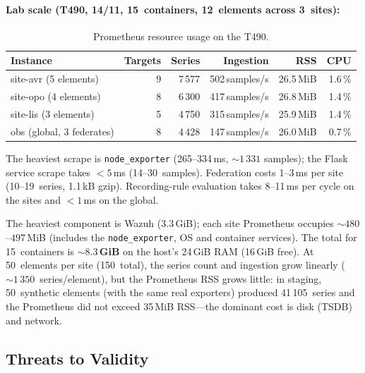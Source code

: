 \documentclass[11pt,a4paper]{article}
\begin{document}
\paragraph{Lab scale (T490, 14/11, 15~containers, 12~elements across 3~sites):}

\begin{table}[H]
  \centering
  \caption{Prometheus resource usage on the T490.}
  \begin{tabular}{@{}lrrrrr@{}}
    \toprule
    \textbf{Instance} & \textbf{Targets} & \textbf{Series} & \textbf{Ingestion} &
      \textbf{RSS} & \textbf{CPU} \\
    \midrule
    site-avr (5 elements) & 9 & 7\,577 & 502\,samples/s & 26.5\,MiB & 1.6\,\% \\
    site-opo (4 elements) & 8 & 6\,300 & 417\,samples/s & 26.8\,MiB & 1.4\,\% \\
    site-lis (3 elements)  & 5 & 4\,750 & 315\,samples/s & 25.9\,MiB & 1.4\,\% \\
    obs (global, 3 federates) & 8 & 4\,428 & 147\,samples/s & 26.0\,MiB & 0.7\,\% \\
    \bottomrule
  \end{tabular}
\end{table}

The heaviest scrape is \texttt{node\_exporter} (265--334\,ms, ${\sim}1\,331$ samples); the
Flask service scrape takes $< 5$\,ms (14--30~samples). Federation costs 1--3\,ms per site
(10--19~series, 1.1\,kB gzip). Recording-rule evaluation takes 8--11\,ms per cycle on the
sites and $< 1$\,ms on the global.

The heaviest component is Wazuh (3.3\,GiB); each site Prometheus occupies
${\sim}480$--$497$\,MiB (includes the \texttt{node\_exporter}, OS and container services).
The total for 15~containers is \textbf{${\sim}8.3$\,GiB} on the host's 24\,GiB RAM
(16\,GiB free). At 50~elements per site (150~total), the series count and ingestion grow
linearly (${\sim}1\,350$~series/element), but the Prometheus RSS grows little: in staging,
50~synthetic elements (with the same real exporters) produced 41\,105~series and the
Prometheus did not exceed 35\,MiB RSS---the dominant cost is disk (TSDB) and network.

\subsection{Threats to Validity}
\end{document}
